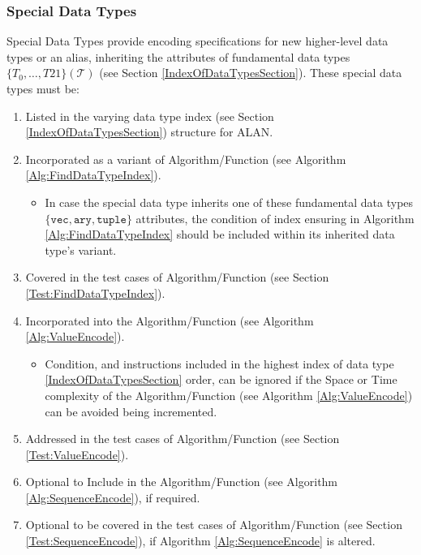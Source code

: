 \documentclass[../alan-handbook.tex]{subfiles}
\begin{document}
\subsubsection{Special Data Types} 
\label{SpecialDataTypes}

Special Data Types provide encoding specifications for new higher-level data types or an alias, inheriting the attributes of fundamental data types $\{T_0,\ldots,T21\}(\mathcal{T})$ (see Section \ref{IndexOfDataTypesSection}). These special data types must be:

\begin{enumerate}
    \item Listed in the varying data type index (see Section \ref{IndexOfDataTypesSection}) structure for ALAN.
    \item Incorporated as a variant of  Algorithm/Function (see Algorithm \ref{Alg:FindDataTypeIndex}).
        \begin{itemize}
            \item In case the special data type inherits one of these fundamental data types $\{\texttt{vec}, \texttt{ary}, \texttt{tuple}\}$ attributes, the condition of index ensuring in Algorithm \ref{Alg:FindDataTypeIndex} should be included within its inherited data type's variant.
        \end{itemize}
    \item Covered in the test cases of  Algorithm/Function (see Section \ref{Test:FindDataTypeIndex}).
    \item Incorporated into the  Algorithm/Function (see Algorithm \ref{Alg:ValueEncode}).
        \begin{itemize}
            \item Condition, and instructions included in the highest index of data type \ref{IndexOfDataTypesSection} order, can be ignored if the Space or Time complexity of the  Algorithm/Function (see Algorithm \ref{Alg:ValueEncode}) can be avoided being incremented.
        \end{itemize}
    \item Addressed in the test cases of  Algorithm/Function (see Section \ref{Test:ValueEncode}).
    \item Optional to Include in the  Algorithm/Function (see Algorithm \ref{Alg:SequenceEncode}), if required.
    \item Optional to be covered in the test cases of  Algorithm/Function (see Section \ref{Test:SequenceEncode}), if Algorithm \ref{Alg:SequenceEncode} is altered.
\end{enumerate}
\end{document}
